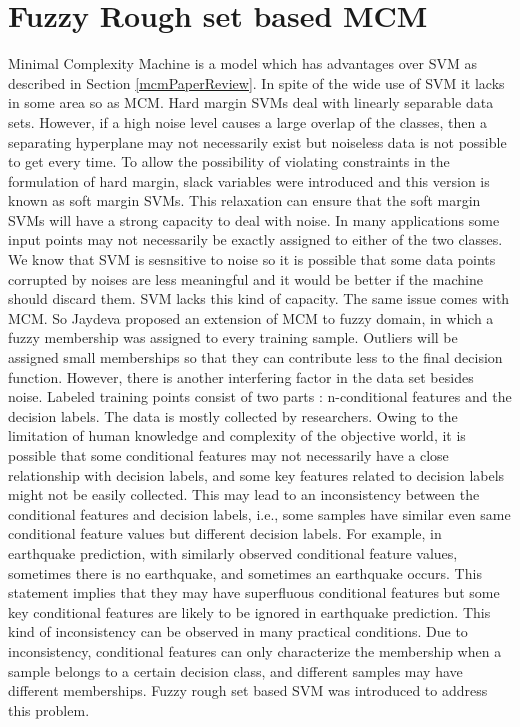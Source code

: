 \chapter{Fuzzy Rough set based MCM}
Minimal Complexity Machine is a model which has advantages over SVM as described in Section \ref{mcmPaperReview}. In spite of the wide use of SVM it lacks in some area so as MCM. Hard margin SVMs deal with linearly separable data sets. However, if a high noise level causes a large overlap of the classes, then a separating hyperplane may not necessarily exist but noiseless data is not possible to get every time. To allow the possibility of violating constraints in the formulation of hard margin, slack variables were introduced and this version is known as soft margin SVMs. This relaxation can ensure that the soft margin SVMs will have a strong capacity to deal with noise. In many applications some input points may not necessarily be exactly assigned to either of the two classes. We know that SVM is sesnsitive to noise so it is possible that some data points corrupted by noises are less meaningful and it would be better if the machine should discard them. SVM lacks this kind
of capacity. The same issue comes with MCM. So Jaydeva \cite{FuzzyMCM} proposed an extension of MCM to fuzzy domain, in which a fuzzy membership  was assigned to every training sample. Outliers will be assigned small memberships so that they can contribute less to the final decision function. However, there is another interfering factor in the data set besides noise. Labeled training points consist of two parts : n-conditional features and the decision labels. The data is mostly collected by researchers. Owing to the limitation of human knowledge
and complexity of the objective world, it is possible that some conditional features may not necessarily have a close relationship with decision labels, and some key features related to decision labels might not be easily collected. This may lead to an inconsistency between the conditional features and decision labels, i.e., some samples have similar even same conditional feature values but different decision labels. For example, in earthquake prediction, with similarly observed conditional feature values, sometimes there is no earthquake, and sometimes an earthquake occurs. This statement implies that they may have superfluous conditional features but some key conditional features are likely to
be ignored in earthquake prediction. This kind of inconsistency can be observed in many practical conditions. Due to inconsistency, conditional features can only characterize the membership when a sample belongs to a certain decision class, and different samples may have different memberships. Fuzzy rough set based SVM \cite{frsvm} was introduced to address this problem.

